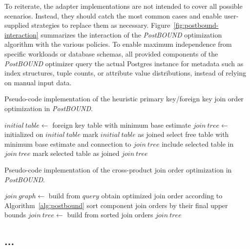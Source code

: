To reiterate, the adapter implementations are not intended to cover all possible scenarios. Instead, they should catch the most common cases and enable user-supplied strategies to replace them as necessary. Figure~\ref{fig:postbound-interaction} summarizes the interaction of the \emph{PostBOUND} optimization algorithm with the various policies. To enable maximum independence from specific workloads or database schemas, all provided components of the \emph{PostBOUND} optimizer query the actual Postgres instance for metadata such as index structures, tuple counts, or attribute value distributions, instead of relying on manual input data.

\begin{algorithm}[tb]
    \caption{Pseudo-code implementation of the heuristic primary key/foreign key join order optimization in \emph{PostBOUND}.}
    \label{alg:postbound-pkfk}
    \begin{algorithmic}[1]
        \State $initial\:table \gets$ foreign key table with minimum base estimate
        \State $join\:tree \gets$ initialized on $initial\:table$
        \State mark $initial\:table$ as joined
            \State select free table with minimum base estimate and connection to $join\:tree$
            \State include selected table in $join\:tree$
            \State mark selected table as joined
        \EndWhile
        \State \Return $join\:tree$
    \end{algorithmic}
\end{algorithm}

\begin{algorithm}[tb]
    \caption{Pseudo-code implementation of the cross-product join order optimization in \emph{PostBOUND}.}
    \label{alg:postbound-crossproduct}
    \begin{algorithmic}[1]
        \State $join\:graph \gets$ build from $query$
            \State obtain optimized join order according to Algorithm~\ref{alg:postbound}
        \EndFor
        \State sort component join orders by their final upper bounds
        \State $join\:tree \gets$ build from sorted join orders
        \State \Return $join\:tree$
    \end{algorithmic}
\end{algorithm}

\subsection{...}
\label{sec:postbound-query-extensions}

